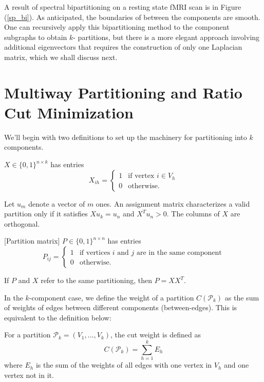 A result of spectral bipartitioning on a resting state fMRI scan
is in Figure (\ref{sp_bi}). As anticipated, the boundaries of between
the components are smooth. One can recursively apply this
bipartitioning method to the component subgraphs to obtain $k$-
partitions, but there is a more elegant approach involving additional
eigenvectors that requires the construction of only one Laplacian
matrix, which we shall discuss next.

\section{Multiway Partitioning and Ratio Cut Minimization}

We'll begin with two definitions to set up the machinery for
partitioning into $k$ components.

\begin{definition}
 $X \in \{0, 1\}^{n \times k}$ has entries
\[ X_{ih} = \begin{cases}
		1 & \mbox{if vertex } i \in V_h \\
		0 & \mbox{otherwise.}
\end{cases} \]
\end{definition}

Let $u_m$ denote a vector of $m$ ones.
An assignment matrix characterizes a valid partition only if it
satisfies $X u_k = u_n$ and $X^T u_n > 0$.
The columns of $X$ are orthogonal.

\begin{definition} \label{partition_matrix}
[Partition matrix] $P \in \{0, 1\}^{n \times n}$ has entries
\[ P_{ij} = \begin{cases}
		1 & \mbox{if vertices } i \mbox{ and } j
		    \mbox{ are in the same component} \\
		0 & \mbox{otherwise.}
\end{cases} \]
\end{definition}

If $P$ and $X$ refer to the same partitioning, then $P = X X^T$.

In the $k$-component case, we define the weight of a partition
$C(\mathcal{P}_k)$ as the sum of weights of edges between different
components (between-edges). This is equivalent to the definition below:

\begin{definition}
 For a partition $\mathcal{P}_k = (V_1, ..., V_k)$, the cut
weight is defined as
\[ C(\mathcal{P}_k) = \sum_{h=1}^k E_h \]
where $E_h$ is the sum of the weights of all edges with one vertex in
$V_h$ and one vertex not in it.
\end{definition}

